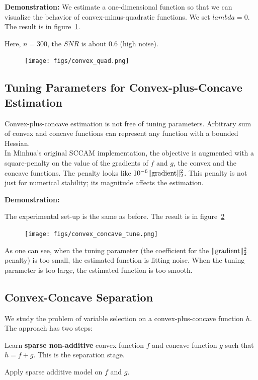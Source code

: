 \documentclass{article}
\begin{document}
\textbf{Demonstration:} We estimate a one-dimensional function so that we can visualize the behavior of convex-minus-quadratic functions. We set $lambda = 0$. The result is in figure~\ref{fig:quad}.

Here, $n=300$, the $SNR$ is about $0.6$ (high noise).  \\


\begin{figure}[htp]
\label{fig:quad}
\centering
\texttt{[image: figs/convex\_quad.png]}
\end{figure}

\subsection{Tuning Parameters for Convex-plus-Concave Estimation}

Convex-plus-concave estimation is not free of tuning parameters. Arbitrary sum of convex and concave functions can represent any function with a bounded Hessian.\\

In Minhua's original SCCAM implementation, the objective is augmented with a square-penalty on the value of the gradients of $f$ and $g$, the convex and the concave functions. The penalty looks like $10^{-6} \| \textrm{gradient} \|_2^2$. This penalty is not just for numerical stability; its magnitude affects the estimation. 

\textbf{Demonstration:}

The experimental set-up is the same as before. The result is in figure~\ref{fig:tuning}

\begin{figure}[htp]
\label{fig:tuning}
\centering
\texttt{[image: figs/convex\_concave\_tune.png]}
\end{figure}

As one can see, when the tuning parameter (the coefficient for the $\| \textrm{gradient} \|_2^2$ penalty) is too small, the estimated function is fitting noise. When the tuning parameter is too large, the estimated function is too smooth.

\subsection{Convex-Concave Separation}

We study the problem of variable selection on a convex-plus-concave function $h$. The approach has two steps: 
\begin{packed_enum}
\item Learn \textbf{sparse non-additive} convex function $f$ and concave function $g$ such that $h = f + g$. This is the separation stage.
\item Apply sparse additive model on $f$ and $g$.
\end{packed_enum}
\end{document}
